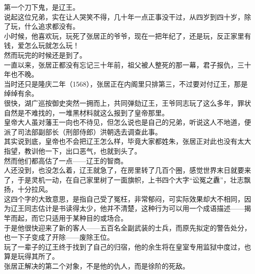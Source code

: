 \begin{multicols}{\theparacolNo}
第一个刀下鬼，是辽王。\\

说起这位兄弟，实在让人哭笑不得，几十年一点正事没干过，从四岁到四十岁，除了玩，什么追求都没有。\\

小时候，他喜欢玩，玩死了张居正的爷爷，现在一把年纪了，还是玩，反正家里有钱，爱怎么玩就怎么玩！\\

然而玩完的时候还是到了。\\

一直以来，张居正都没有忘记三十年前，祖父被人整死的那一幕，君子报仇，三十年也不晚。\\

当时还只是隆庆二年（1568），张居正在内阁里只排第三，不过要对付辽王，那是绰绰有余。\\

很快，湖广巡按御史突然一拥而上，共同弹劾辽王，王爷同志玩了这么多年，罪状自然是不难找的，一堆黑材料就这么报到了皇帝那里。\\

皇帝大人虽对藩王一向也不待见，但怎么说也是自己的兄弟，听说这人不地道，便派了司法部副部长（刑部侍郎）洪朝选去调查此事。\\

其实说到底，皇帝也不会把辽王怎么样，毕竟大家都姓朱，张居正对此也没有太大指望，教训他一下，出口恶气，也就到头了。\\

然而他们都高估了一点——辽王的智商。\\

人还没到，也没怎么着，辽王就急了，在房里转了几百个圈，感觉世界末日就要来了，于是灵机一动，在自己家里树了一面旗帜，上书四个大字“讼冤之纛”，壮志飘扬，十分拉风。\\

这四个字的大致意思，是指自己受了冤枉，非常郁闷，可实际效果却大不相同，因为辽王同志估计是书读得太少，他并不清楚，这种行为可以用一个成语描述——揭竿而起，而它只适用于某种目的或场合。\\

于是他很快迎来了新的客人——五百名全副武装的士兵，而原先拟定的警告处分，也一下子变成了开除——废除王位。\\

玩了一辈子的辽王终于找到了自己的归宿，他的余生将在皇室专用监狱中度过，也算是玩得其所了。\\

张居正解决的第二个对象，不是他的仇人，而是徐阶的死敌。\\


\end{multicols}
